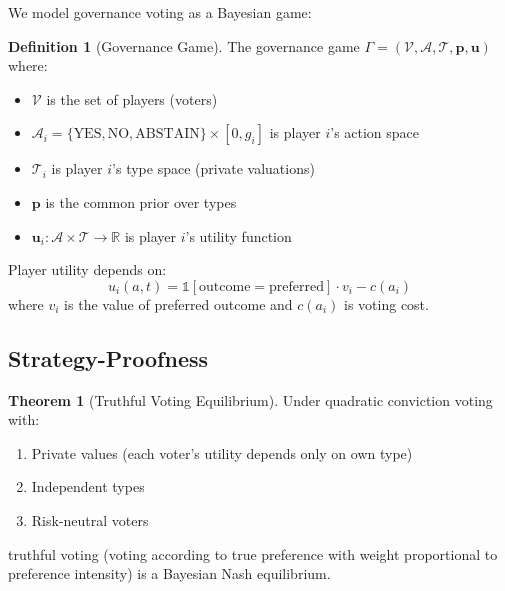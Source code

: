 \documentclass[11pt,a4paper]{article}
\theoremstyle{definition}
\newtheorem{definition}{Definition}[section]
\newtheorem{theorem}{Theorem}[section]
\theoremstyle{remark}
\begin{document}
We model governance voting as a Bayesian game:

\begin{definition}[Governance Game]
The governance game $\Gamma = (\mathcal{V}, \mathcal{A}, \mathcal{T}, \mathbf{p}, \mathbf{u})$ where:
\begin{itemize}
    \item $\mathcal{V}$ is the set of players (voters)
    \item $\mathcal{A}_i = \{\text{YES}, \text{NO}, \text{ABSTAIN}\} \times [0, g_i]$ is player $i$'s action space
    \item $\mathcal{T}_i$ is player $i$'s type space (private valuations)
    \item $\mathbf{p}$ is the common prior over types
    \item $\mathbf{u}_i: \mathcal{A} \times \mathcal{T} \to \mathbb{R}$ is player $i$'s utility function
\end{itemize}
\end{definition}

Player utility depends on:
\begin{equation}
    u_i(a, t) = \mathbb{1}[\text{outcome} = \text{preferred}] \cdot v_i - c(a_i)
\end{equation}
where $v_i$ is the value of preferred outcome and $c(a_i)$ is voting cost.

\subsection{Strategy-Proofness}

\begin{theorem}[Truthful Voting Equilibrium]
Under quadratic conviction voting with:
\begin{enumerate}
    \item Private values (each voter's utility depends only on own type)
    \item Independent types
    \item Risk-neutral voters
\end{enumerate}
truthful voting (voting according to true preference with weight proportional to preference intensity) is a Bayesian Nash equilibrium.
\end{theorem}
\end{document}
